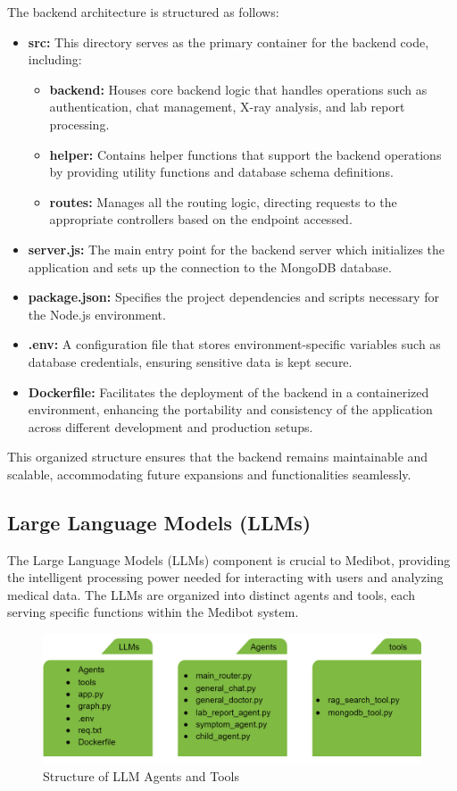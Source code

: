 The backend architecture is structured as follows:
\begin{itemize}
    \item \textbf{src:} This directory serves as the primary container for the backend code, including:
    \begin{itemize}
        \item \textbf{backend:} Houses core backend logic that handles operations such as authentication, chat management, X-ray analysis, and lab report processing.
        \item \textbf{helper:} Contains helper functions that support the backend operations by providing utility functions and database schema definitions.
        \item \textbf{routes:} Manages all the routing logic, directing requests to the appropriate controllers based on the endpoint accessed.
    \end{itemize}
    \item \textbf{server.js:} The main entry point for the backend server which initializes the application and sets up the connection to the MongoDB database.
    \item \textbf{package.json:} Specifies the project dependencies and scripts necessary for the Node.js environment.
    \item \textbf{.env:} A configuration file that stores environment-specific variables such as database credentials, ensuring sensitive data is kept secure.
    \item \textbf{Dockerfile:} Facilitates the deployment of the backend in a containerized environment, enhancing the portability and consistency of the application across different development and production setups.
\end{itemize}

This organized structure ensures that the backend remains maintainable and scalable, accommodating future expansions and functionalities seamlessly.


\subsection{Large Language Models (LLMs)}
The Large Language Models (LLMs) component is crucial to Medibot, providing the intelligent processing power needed for interacting with users and analyzing medical data. The LLMs are organized into distinct agents and tools, each serving specific functions within the Medibot system.

\begin{figure}[H]
    \centering
    \includegraphics[width=\textwidth]{./Figures/AgentCodeStructure.png}
    \caption{Structure of LLM Agents and Tools}
    \label{fig:llm_agents_structure}
\end{figure}

